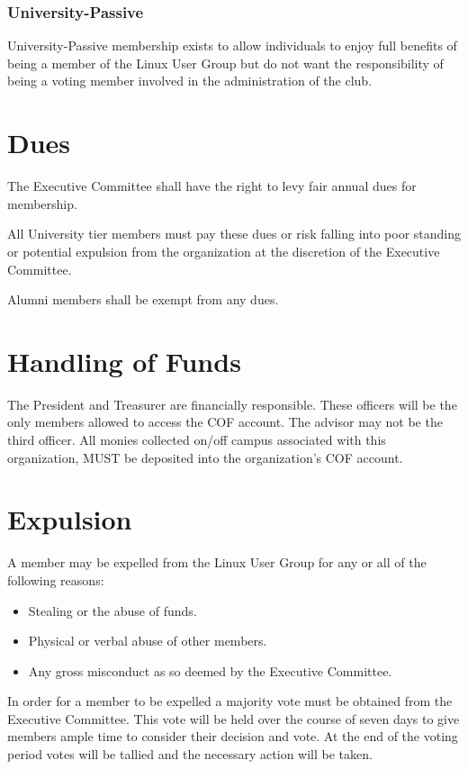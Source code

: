 \documentclass[letter]{report}
\begin{document}
\subsubsection{University-Passive}
University-Passive membership exists to allow individuals to enjoy full benefits
of being a member of the Linux User Group but do not want the responsibility of
being a voting member involved in the administration of the club.

\section{Dues}
The Executive Committee shall have the right to levy fair annual dues for
membership.

All University tier members must pay these dues or risk falling into poor
standing or potential expulsion from the organization at the discretion of the
Executive Committee.

Alumni members shall be exempt from any dues.

\section{Handling of Funds}
The President and Treasurer are financially responsible. These officers will be
the only members allowed to access the COF account. The advisor may not be the
third officer. All monies collected on/off campus associated with this
organization, MUST be deposited into the organization’s COF account.

\section{Expulsion}
A member may be expelled from the Linux User Group for any or all of the
following reasons:
\begin{itemize}
	\item Stealing or the abuse of funds.
	\item Physical or verbal abuse of other members.
	\item Any gross misconduct as so deemed by the Executive Committee.
\end{itemize}
In order for a member to be expelled a majority vote must be obtained from the
Executive Committee. This vote will be held over the course of seven days to
give members ample time to consider their decision and vote. At the end of the
voting period votes will be tallied and the necessary action will be taken.
\end{document}
